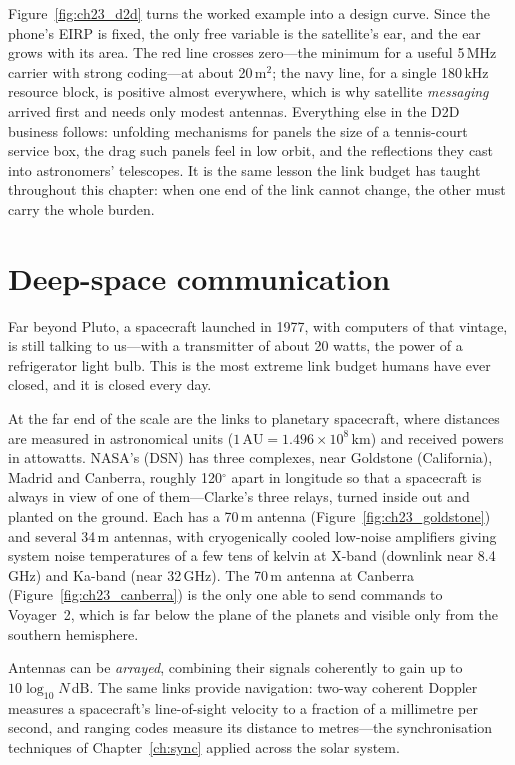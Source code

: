 Figure~\ref{fig:ch23_d2d} turns the worked example into a design curve. Since the phone's EIRP is
fixed, the only free variable is the satellite's ear, and the ear grows with its area. The red
line crosses zero---the minimum for a useful 5\,MHz carrier with strong coding---at about
20\,m$^2$; the navy line, for a single 180\,kHz resource block, is positive almost everywhere,
which is why satellite \emph{messaging} arrived first and needs only modest antennas. Everything
else in the D2D business follows: unfolding mechanisms for panels the size of a tennis-court
service box, the drag such panels feel in low orbit, and the reflections they cast into
astronomers' telescopes. It is the same lesson the link budget has taught throughout this chapter:
when one end of the link cannot change, the other must carry the whole burden.

\section{Deep-space communication}
\label{sec:ch23:deepspace}


Far beyond Pluto, a spacecraft launched in 1977, with computers of that vintage, is still talking
to us---with a transmitter of about 20 watts, the power of a refrigerator light bulb. This is the most extreme link budget humans have ever closed, and it is closed every
day.

At the far end of the scale are the links to planetary spacecraft, where distances are measured in
astronomical units ($1\,\text{AU}=1.496\times10^8$\,km) and received powers in attowatts. NASA's
 (DSN) has three complexes, near Goldstone (California), Madrid and
Canberra, roughly 120$^\circ$ apart in longitude so that a spacecraft is always in view of one of
them---Clarke's three relays, turned inside out and planted on the ground. Each has a 70\,m antenna
(Figure~\ref{fig:ch23_goldstone}) and several 34\,m antennas, with cryogenically cooled low-noise
amplifiers giving system noise temperatures of a few tens of kelvin at X-band (downlink near
8.4\,GHz) and Ka-band (near 32\,GHz). The 70\,m antenna at Canberra (Figure~\ref{fig:ch23_canberra})
is the only one able to send commands to Voyager~2, which is far below the plane of the planets and
visible only from the southern hemisphere.



Antennas can be \emph{arrayed}, combining their signals coherently to gain up to
$10\log_{10}N$\,dB. The same links provide navigation: two-way coherent Doppler measures a
spacecraft's line-of-sight velocity to a fraction of a millimetre per second, and ranging codes
measure its distance to metres---the synchronisation techniques of Chapter~\ref{ch:sync}
applied across the solar system.


